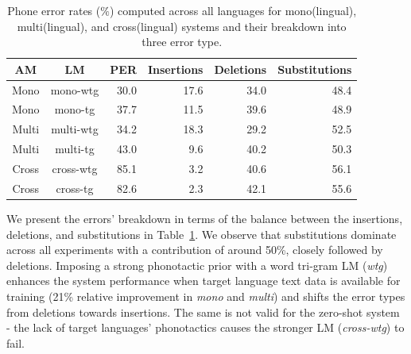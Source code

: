 \documentclass{article}
\begin{document}
\begin{table}[t]
\renewcommand\arraystretch{0.8}
    \centering
     \resizebox{1\linewidth}{!}
      {
    \begin{tabular}{ccrrrr}
    \toprule
    AM    & LM        & PER & Insertions & Deletions & Substitutions \\
    \midrule
    Mono  & mono-wtg  & 30.0 & 17.6 & 34.0 & 48.4 \\
    Mono  & mono-tg   & 37.7 & 11.5 & 39.6 & 48.9 \\
    Multi & multi-wtg & 34.2 & 18.3 & 29.2 & 52.5 \\
    Multi & multi-tg  & 43.0 &  9.6 & 40.2 & 50.3 \\
    Cross & cross-wtg & 85.1 &  3.2 & 40.6 & 56.1 \\
    Cross & cross-tg  & 82.6 &  2.3 & 42.1 & 55.6 \\
    \bottomrule
    \end{tabular}
    }
    \caption{Phone error rates ($\%$) computed across all languages for mono(lingual), multi(lingual), and cross(lingual) systems and their breakdown into three error type.}
    \label{tab:error_fraction}
\end{table}

We present the errors' breakdown in terms of the balance between the insertions, deletions, and substitutions in Table~\ref{tab:error_fraction}.
We observe that substitutions dominate across all experiments with a contribution of around 50\%, closely followed by deletions. 
Imposing a strong phonotactic prior with a word tri-gram LM (\emph{wtg}) enhances the system performance when target language text data is available for training (21\% relative improvement in \emph{mono} and \emph{multi}) and shifts the error types from deletions towards insertions.
The same is not valid for the zero-shot system - the lack of target languages' phonotactics causes the stronger LM (\emph{cross-wtg}) to fail.
\end{document}

